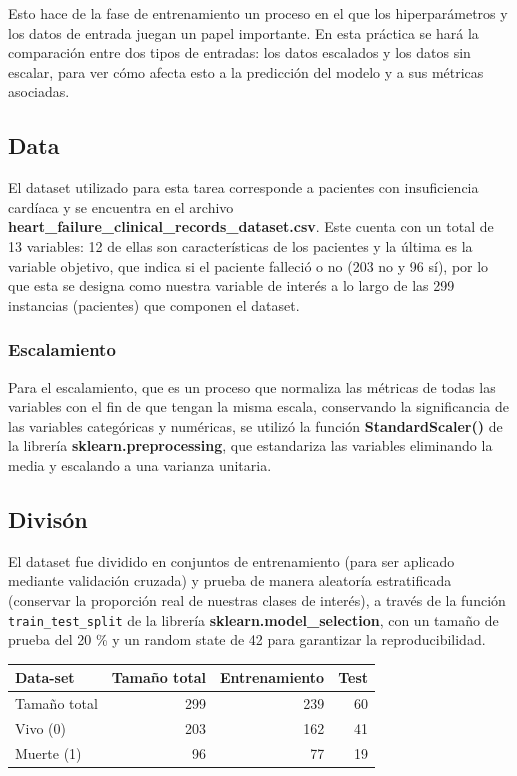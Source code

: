 \documentclass[
  10pt,
]{article}
\newcounter{none} %
\begin{document}
Esto hace de la fase de entrenamiento un proceso en el que los
hiperparámetros y los datos de entrada juegan un papel importante. En
esta práctica se hará la comparación entre dos tipos de entradas: los
datos escalados y los datos sin escalar, para ver cómo afecta esto a la
predicción del modelo y a sus métricas asociadas.

\subsection{Data}\label{data}

El dataset utilizado para esta tarea corresponde a pacientes con
insuficiencia cardíaca y se encuentra en el archivo
\textbf{heart\_failure\_clinical\_records\_dataset.csv}. Este cuenta con
un total de 13 variables: 12 de ellas son características de los
pacientes y la última es la variable objetivo, que indica si el paciente
falleció o no (203 no y 96 sí), por lo que esta se designa como nuestra
variable de interés a lo largo de las 299 instancias (pacientes) que
componen el dataset.

\subsubsection{Escalamiento}\label{escalamiento}

Para el escalamiento, que es un proceso que normaliza las métricas de
todas las variables con el fin de que tengan la misma escala,
conservando la significancia de las variables categóricas y numéricas,
se utilizó la función \textbf{StandardScaler()} de la librería
\textbf{sklearn.preprocessing}, que estandariza las variables eliminando
la media y escalando a una varianza unitaria.

\subsection{Divisón}\label{divisuxf3n}

El dataset fue dividido en conjuntos de entrenamiento (para ser aplicado
mediante validación cruzada) y prueba de manera aleatoría estratificada
(conservar la proporción real de nuestras clases de interés), a través
de la función \texttt{train\_test\_split} de la librería
\textbf{sklearn.model\_selection}, con un tamaño de prueba del 20 \% y
un random state de 42 para garantizar la reproducibilidad.

{\def\LTcaptype{none} %
\begin{longtable}[]{@{}lrrr@{}}
\toprule\noalign{}
Data-set & Tamaño total & Entrenamiento & Test \\
\midrule\noalign{}
\endhead
\bottomrule\noalign{}
\endlastfoot
Tamaño total & 299 & 239 & 60 \\
Vivo (0) & 203 & 162 & 41 \\
Muerte (1) & 96 & 77 & 19 \\
\end{longtable}
}
\end{document}
